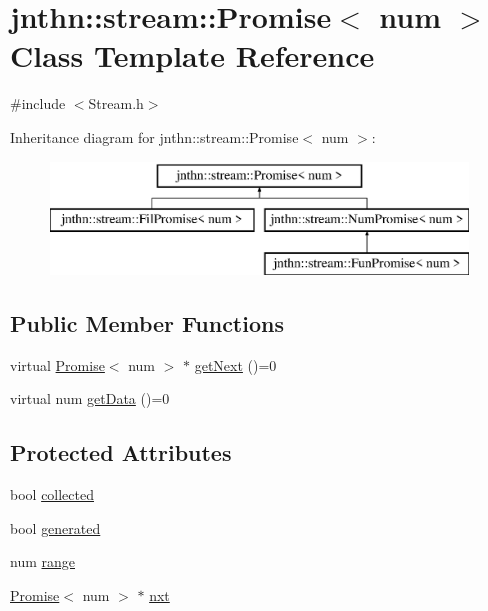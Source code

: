 \hypertarget{classjnthn_1_1stream_1_1Promise}{\section{jnthn\-:\-:stream\-:\-:Promise$<$ num $>$ Class Template Reference}
\label{classjnthn_1_1stream_1_1Promise}
}


{\ttfamily \#include $<$Stream.\-h$>$}

Inheritance diagram for jnthn\-:\-:stream\-:\-:Promise$<$ num $>$\-:\begin{figure}[H]
\begin{center}
\leavevmode
\includegraphics[height=3.000000cm]{classjnthn_1_1stream_1_1Promise}
\end{center}
\end{figure}
\subsection*{Public Member Functions}
\begin{DoxyCompactItemize}
\item 
virtual \hyperlink{classjnthn_1_1stream_1_1Promise}{Promise}$<$ num $>$ $\ast$ \hyperlink{classjnthn_1_1stream_1_1Promise_a83cb9bc924207558629fc5a2908d5216}{get\-Next} ()=0
\item 
virtual num \hyperlink{classjnthn_1_1stream_1_1Promise_af38928d3d23181ac68cc4a75c28ce253}{get\-Data} ()=0
\end{DoxyCompactItemize}
\subsection*{Protected Attributes}
\begin{DoxyCompactItemize}
\item 
bool \hyperlink{classjnthn_1_1stream_1_1Promise_ae1a23ef176aea5eac26c4d79a784b160}{collected}
\item 
bool \hyperlink{classjnthn_1_1stream_1_1Promise_a6b73728f5d4cbfe7ee23747fd5bcb98d}{generated}
\item 
num \hyperlink{classjnthn_1_1stream_1_1Promise_a189ef0405c6ddb48e4c204e242c2116b}{range}
\item 
\hyperlink{classjnthn_1_1stream_1_1Promise}{Promise}$<$ num $>$ $\ast$ \hyperlink{classjnthn_1_1stream_1_1Promise_a8c1da70608dd6397d0d0ad81c2db89e0}{nxt}
\end{DoxyCompactItemize}


